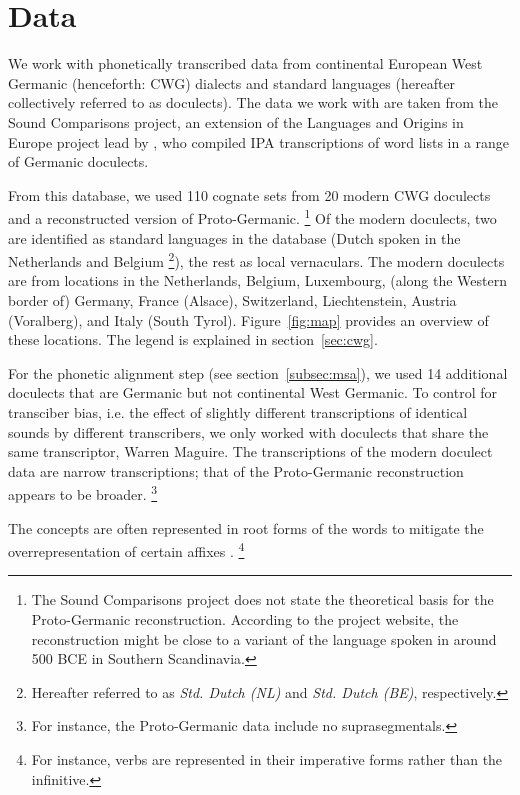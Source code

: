 \documentclass[a4paper]{article}
\begin{document}
\section{Data}
\label{sec:data}

We work with phonetically transcribed data from
continental European West Germanic (henceforth: CWG)
dialects and standard languages
(hereafter collectively referred to as doculects).
The data we work with are taken from the Sound Comparisons project,
an extension of the Languages and Origins in Europe project \citep{renfrew2009languages}
lead by \citet{heggarty2018sound},
who compiled IPA transcriptions of word lists
in a range of Germanic doculects.

From this database,
we used 110 cognate sets from 20 modern CWG doculects
and a reconstructed version of Proto-Germanic.
\footnote{
The Sound Comparisons project does not state
the theoretical basis for the Proto-Germanic reconstruction.
According to the project website,
the reconstruction might be close to
a variant of the language spoken in around 500 BCE
in Southern Scandinavia.
}
Of the modern doculects, two are identified as standard languages
in the database (Dutch spoken in the Netherlands and Belgium
\footnote{
Hereafter referred to as \textit{Std. Dutch (NL)}
and \textit{Std. Dutch (BE)}, respectively.
}),
the rest as local vernaculars.
The modern doculects are from locations in the
Netherlands, Belgium, Luxembourg, (along the Western border of) Germany,
France (Alsace), Switzerland, Liechtenstein, Austria (Voralberg), and Italy (South Tyrol).
Figure~\ref{fig:map} provides an overview of these locations.
The legend is explained in section~\ref{sec:cwg}.

For the phonetic alignment step (see section~\ref{subsec:msa}),
we used 14 additional doculects that are Germanic but not continental West Germanic. 
To control for transciber bias,
i.e. the effect of slightly different transcriptions
of identical sounds by different transcribers,
we only worked with doculects that share the same transcriptor,
Warren Maguire.
The transcriptions of the modern doculect data
are narrow transcriptions;
that of the Proto-Germanic reconstruction appears to be broader.
\footnote{
For instance, the Proto-Germanic data include no suprasegmentals.
}

The concepts are often represented in root forms
of the words to mitigate the overrepresentation
of certain affixes \citep{renfrew2009languages}.
\footnote{
For instance, verbs are represented in their imperative forms
rather than the infinitive.
}
\end{document}

